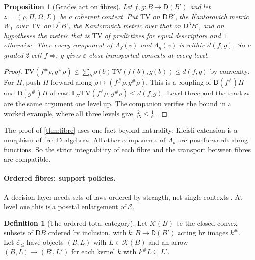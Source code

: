 \documentclass[11pt]{article}
\newtheorem{proposition}[theorem]{Proposition}
\theoremstyle{definition}
\newtheorem{definition}[theorem]{Definition}
\theoremstyle{remark}
\newcommand{\D}{\mathsf{D}}
\newcommand{\TV}{\mathrm{TV}}
\begin{document}
\begin{proposition}[Grades act on fibres]\label{prop:gradefibre}
Let $f,g\colon B\to\D(B')$ and let $z=(\rho,\Pi,\Omega,\Sigma)$ be a coherent context. Put $\mathrm{TV}$ on $\D B'$, the
Kantorovich metric $W_1$ over $\mathrm{TV}$ on $\D^2B'$, the Kantorovich metric over that on $\D^3B'$, and on hypotheses the
metric that is $\TV$ of predictives for equal descriptors and $1$ otherwise. Then every component of $A_f(z)$ and
$A_g(z)$ is within $d(f,g)$. So a graded 2-cell $f\Rightarrow_\varepsilon g$ gives $\varepsilon$-close transported contexts at
every level.
\end{proposition}
\begin{proof}
$\TV(f^\#\rho,g^\#\rho)\le\sum_b\rho(b)\TV(f(b),g(b))\le d(f,g)$ by convexity. For $\Pi$, push $\Pi$ forward along
$\rho\mapsto(f^\#\rho,g^\#\rho)$. This is a coupling of $\D(f^\#)\Pi$ and $\D(g^\#)\Pi$ of cost $\mathbb E_\Pi\TV(f^\#\rho,g^\#\rho)\le d(f,g)$.
Level three and the shadow are the same argument one level up. The companion verifies the bound in a worked
example, where all three levels give $\tfrac2{15}\le\tfrac16$ \cite[\S11]{Awasthi-Family}.
\end{proof}

The proof of \cref{thm:fibre} uses one fact beyond naturality: Kleisli extension is a morphism of free
$\D$-algebras. All other components of $A_k$ are pushforwards along functions. So the strict integrability of
each fibre and the transport between fibres are compatible.

\paragraph{Ordered fibres: support policies.} A decision layer needs sets of laws ordered by strength, not single contexts
\cite[Section~14]{Awasthi-Validation}. At level one this is a posetal enlargement of $\mathcal E$.

\begin{definition}[The ordered total category]\label{def:ordered}
Let $\mathcal K(B)$ be the closed convex subsets of $\D B$ ordered by inclusion, with $k\colon B\to\D(B')$ acting by images $k^\#$.
Let $\mathcal E_{\le}$ have objects $(B,L)$ with $L\in\mathcal K(B)$ and an arrow $(B,L)\to(B',L')$ for each kernel $k$ with
$k^\#L\subseteq L'$.
\end{definition}
\end{document}
